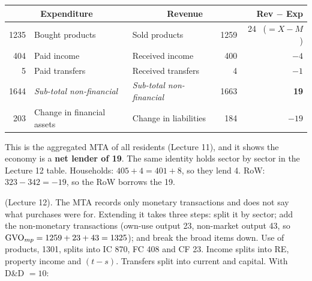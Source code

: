 \begin{center}\small
\begin{tabular}{@{}rl|lr|r@{}}
\toprule
\multicolumn{2}{c|}{\textbf{Expenditure}} & \multicolumn{2}{c|}{\textbf{Revenue}} & \textbf{Rev $-$ Exp} \\
\midrule
1235 & Bought products & Sold products & 1259 & 24 \ ($=X-M$) \\
404 & Paid income & Received income & 400 & $-4$ \\
5 & Paid transfers & Received transfers & 4 & $-1$ \\
1644 & \textit{Sub-total non-financial} & \textit{Sub-total non-financial} & 1663 & \textbf{19} \\
203 & Change in financial assets & Change in liabilities & 184 & $-19$ \\
\bottomrule
\end{tabular}
\end{center}
This is the aggregated MTA of all residents (Lecture 11), and it shows the economy is a
\textbf{net lender of 19}. The same identity holds sector by sector in the Lecture 12 table.
Households: $405+4=401+8$, so they lend 4. RoW: $323-342=-19$, so the RoW borrows the 19.

 (Lecture 12). The MTA records only monetary transactions and
does not say what purchases were for. Extending it takes three steps: split it by sector; add the
non-monetary transactions (own-use output 23, non-market output 43, so $\mathrm{GVO}_{mp}=1259+23+43=1325$);
and break the broad items down. Use of products, 1301, splits into IC 870, FC 408 and CF 23.
Income splits into RE, property income and $(t-s)$. Transfers split into current and capital. With
D\&D $=10$:

